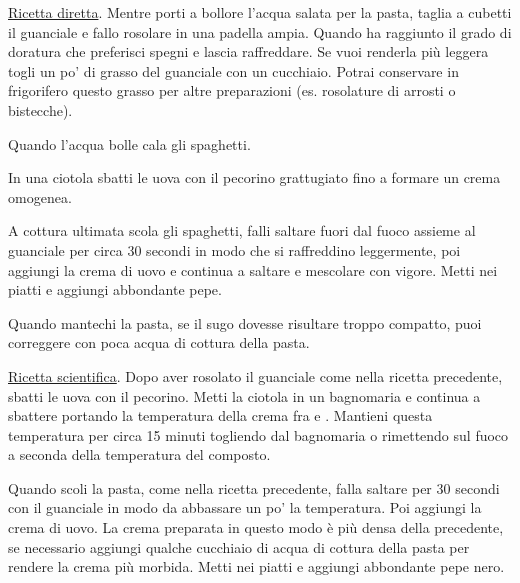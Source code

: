 \begin{method}
	\underline{Ricetta diretta}. Mentre porti a bollore l'acqua salata per la pasta, taglia a cubetti il guanciale e fallo rosolare in una padella ampia. Quando ha raggiunto il grado di doratura che preferisci spegni e lascia raffreddare. Se vuoi renderla più leggera togli un po' di grasso del guanciale con un cucchiaio. Potrai conservare in frigorifero questo grasso per altre preparazioni (es. rosolature di arrosti o bistecche). 

	Quando l'acqua bolle cala gli spaghetti.

	In una ciotola sbatti le uova con il pecorino grattugiato fino a formare un crema omogenea.

	A cottura ultimata scola gli spaghetti, falli saltare fuori dal fuoco assieme al guanciale per circa 30 secondi in modo che si raffreddino leggermente, poi aggiungi la crema di uovo e continua a saltare e mescolare con vigore. Metti nei piatti e aggiungi abbondante pepe.
	
	Quando mantechi la pasta, se il sugo dovesse risultare troppo compatto, puoi correggere con poca acqua di cottura della pasta.

	\underline{Ricetta scientifica}. Dopo aver rosolato il guanciale come nella ricetta precedente, sbatti le uova con il pecorino. Metti la ciotola in un bagnomaria e continua a sbattere portando la temperatura della crema fra  e . Mantieni questa temperatura per circa 15 minuti togliendo dal bagnomaria o rimettendo sul fuoco a seconda della temperatura del composto.

	Quando scoli la pasta, come nella ricetta precedente, falla saltare per 30 secondi con il guanciale in modo da abbassare un po' la temperatura. Poi aggiungi la crema di uovo. La crema preparata in questo modo è più densa della precedente, se necessario aggiungi qualche cucchiaio di acqua di cottura della pasta per rendere la crema più morbida. Metti nei piatti e aggiungi abbondante pepe nero.


\end{method}




